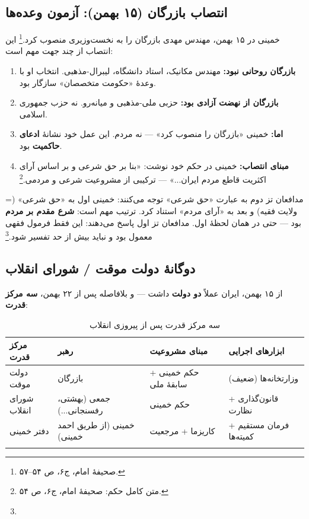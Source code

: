 \documentclass[12pt,a4paper]{book}
\newcommand{\keyword}[1]{\textbf{\textcolor{cPrimary}{#1}}}
\newcommand{\en}[1]{\lr{\textit{#1}}}
\begin{document}
\subsection{انتصاب بازرگان (۱۵ بهمن): آزمون وعده‌ها}

خمینی در ۱۵ بهمن، مهندس مهدی بازرگان را به نخست‌وزیری منصوب کرد.\footnote{صحیفهٔ امام، ج۶، ص ۵۴–۵۷.} این انتصاب از چند جهت مهم است:

\begin{enumerate}[label=\textcolor{cPrimary}{\bfseries\arabic*.}, rightmargin=2em]
    \item \textbf{بازرگان روحانی نبود:} مهندس مکانیک، استاد دانشگاه، لیبرال-مذهبی. انتخاب او با وعدهٔ «حکومت متخصصان» سازگار بود.
    \item \textbf{بازرگان از نهضت آزادی بود:} حزبی ملی-مذهبی و میانه‌رو. نه حزب جمهوری اسلامی.
    \item \textbf{اما:} خمینی «بازرگان را منصوب کرد» — نه مردم. این عمل خود نشانهٔ \keyword{ادعای حاکمیت} بود.
    \item \textbf{مبنای انتصاب:} خمینی در حکم خود نوشت: «بنا بر حق شرعی و بر اساس آرای اکثریت قاطع مردم ایران...» — ترکیبی از مشروعیت شرعی و مردمی.\footnote{متن کامل حکم: صحیفهٔ امام، ج۶، ص ۵۴.}
\end{enumerate}

\begin{warningBox}
مدافعان تز دوم به عبارت «حق شرعی» توجه می‌کنند: خمینی اول به «حق شرعی» (= ولایت فقیه) و بعد به «آرای مردم» استناد کرد. ترتیب مهم است: \keyword{شرع مقدم بر مردم} بود — حتی در همان لحظهٔ اول. مدافعان تز اول پاسخ می‌دهند: این فقط فرمول فقهی معمول بود و نباید بیش از حد تفسیر شود.\footnote{\en{Martin (2000), pp.\,152--158.}}
\end{warningBox}

\subsection{دوگانهٔ دولت موقت / شورای انقلاب}

از ۱۵ بهمن، ایران عملاً \keyword{دو دولت} داشت — و بلافاصله پس از ۲۲ بهمن، \keyword{سه مرکز قدرت}:

\begin{longtable}{%
    >{\raggedleft\arraybackslash}p{}
    >{\raggedleft\arraybackslash}p{}
    >{\raggedleft\arraybackslash}p{}
    >{\raggedleft\arraybackslash}p{}}
\toprule
\rowcolor{cPrimary!10}
\textbf{مرکز قدرت} & \textbf{رهبر} & \textbf{مبنای مشروعیت} & \textbf{ابزارهای اجرایی} \\
\midrule
\endhead

دولت موقت &
بازرگان &
حکم خمینی + سابقهٔ ملی &
وزارتخانه‌ها (ضعیف) \\
\midrule

شورای انقلاب &
جمعی (بهشتی، رفسنجانی...) &
حکم خمینی &
قانون‌گذاری + نظارت \\
\midrule

دفتر خمینی &
خمینی (از طریق احمد خمینی) &
کاریزما + مرجعیت &
فرمان مستقیم + کمیته‌ها \\

\bottomrule
\caption{سه مرکز قدرت پس از پیروزی انقلاب}
\label{tab:power-centers}
\end{longtable}
\end{document}
